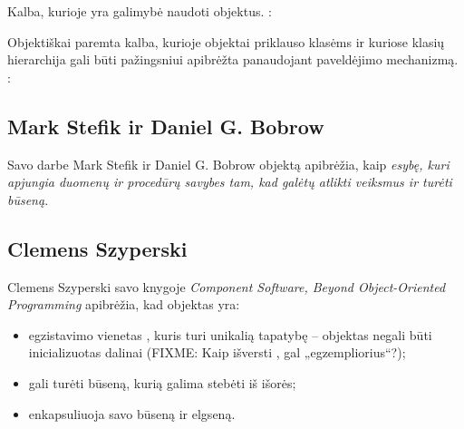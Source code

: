 \begin{defn}
  Kalba, kurioje yra galimybė naudoti objektus.
  \cite[169]{Wegner:1987:DOL:38807.38823}:
\end{defn}

\begin{defn}
  Objektiškai paremta kalba, kurioje objektai priklauso klasėms ir kuriose
  klasių hierarchija gali būti pažingsniui apibrėžta panaudojant paveldėjimo
  mechanizmą.
  \cite[169]{Wegner:1987:DOL:38807.38823}:
\end{defn}

\begin{comment}
  Šis autorius objektinę paradigmą nagrinėja labai plačiai:
  išskiria beklases programavimo kalbas (aktorių ir prototipinę)
  bei klasines programavimo kalbas, bet pastarąsias yra linkęs laikyti
  svarbesnėmis (jas vadina objektiškai orientuotomis). Jo nuomone
  beklasės objektinės kalbos tinka eksperimentavimui, nes jos yra
  lanksčios, o klasinės (ir tuo labiau stipriai tipizuotos bei kuriose
  yra realizuota duomenų abstrakcija) – „produkcijai“, nes jose
  daug problemų gali pagauti kompiliatorius. Autorius išreiškė
  mintį, kad visiškai naujos dalykinės srities modeliavimas turėtų
  būti pradedamas naudojant beklasę programavimo kalbą ir tada, kai
  jau pasidaro aiškios bendros objektų savybės išskirti klases ir
  „pernešti“ visą modelį į klasinę programavimo kalbą.

  Taip pat verta pastebėti, kad Peter Wegner paveldėjimą
  \en{inheritance} laiko ne alternatyva pavedimui \en{delegation},
  bet jo specializacija.
\end{comment}

\subsection{Mark Stefik ir Daniel G. Bobrow}

Savo darbe\cite[41]{OOP-themes-and-variations} Mark Stefik ir Daniel G.
Bobrow objektą apibrėžia, kaip \emph{esybę, kuri apjungia duomenų ir
procedūrų savybes tam, kad galėtų atlikti veiksmus ir turėti būseną}.

\subsection{Clemens Szyperski}

Clemens Szyperski savo knygoje \emph{Component Software, Beyond
Object-Oriented Programming} apibrėžia, kad objektas
yra\cite[37]{cs-beyond-object-oriented-programming}:
\begin{itemize}
  \item egzistavimo vienetas , kuris turi
    unikalią tapatybę – objektas negali būti inicializuotas dalinai
    (FIXME: Kaip išversti , gal „egzempliorius“?);
  \item gali turėti būseną, kurią galima stebėti iš išorės;
  \item enkapsuliuoja savo būseną ir elgseną.
\end{itemize}

